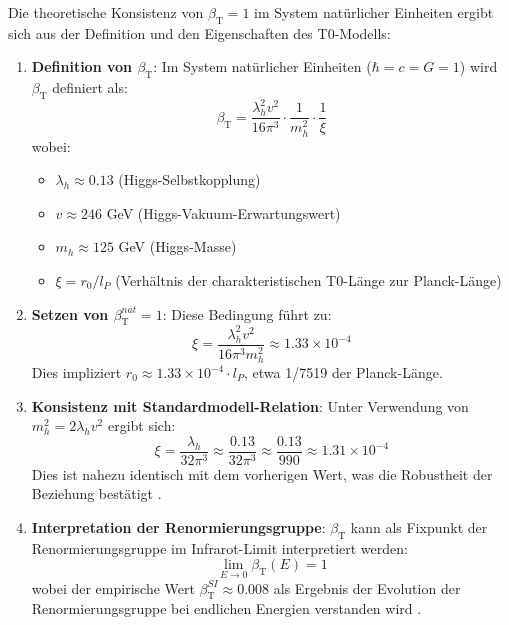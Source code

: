 \documentclass[12pt,a4paper]{article}
\newcommand{\betaT}{\beta_{\text{T}}}
\begin{document}
	Die theoretische Konsistenz von $\betaT = 1$ im System natürlicher Einheiten ergibt sich aus der Definition und den Eigenschaften des T0-Modells:
	
	\begin{enumerate}
		\item \textbf{Definition von $\betaT$}: Im System natürlicher Einheiten ($\hbar = c = G = 1$) wird $\betaT$ definiert als:
		\begin{equation}
			\betaT = \frac{\lambda_h^2 v^2}{16\pi^3} \cdot \frac{1}{m_h^2} \cdot \frac{1}{\xi}
		\end{equation}
		wobei:
		\begin{itemize}
			\item $\lambda_h \approx 0.13$ (Higgs-Selbstkopplung)
			\item $v \approx 246$ GeV (Higgs-Vakuum-Erwartungswert)
			\item $m_h \approx 125$ GeV (Higgs-Masse)
			\item $\xi = r_0/l_P$ (Verhältnis der charakteristischen T0-Länge zur Planck-Länge)
		\end{itemize}
		
		\item \textbf{Setzen von $\betaT^{nat} = 1$}: Diese Bedingung führt zu:
		\begin{equation}
			\xi = \frac{\lambda_h^2 v^2}{16\pi^3 m_h^2} \approx 1.33 \times 10^{-4}
		\end{equation}
		Dies impliziert $r_0 \approx 1.33 \times 10^{-4} \cdot l_P$, etwa 1/7519 der Planck-Länge.
		
		\item \textbf{Konsistenz mit Standardmodell-Relation}: Unter Verwendung von $m_h^2 = 2\lambda_h v^2$ ergibt sich:
		\begin{equation}
			\xi = \frac{\lambda_h}{32\pi^3} \approx \frac{0.13}{32\pi^3} \approx \frac{0.13}{990} \approx 1.31 \times 10^{-4}
		\end{equation}
		Dies ist nahezu identisch mit dem vorherigen Wert, was die Robustheit der Beziehung bestätigt \cite{pascher_alphabeta_2025}.
		
		\item \textbf{Interpretation der Renormierungsgruppe}: $\betaT$ kann als Fixpunkt der Renormierungsgruppe im Infrarot-Limit interpretiert werden:
		\begin{equation}
			\lim_{E \to 0} \betaT(E) = 1
		\end{equation}
		wobei der empirische Wert $\betaT^{SI} \approx 0.008$ als Ergebnis der Evolution der Renormierungsgruppe bei endlichen Energien verstanden wird \cite{pascher_alphabeta_2025}.
	\end{enumerate}
	
\end{document}
